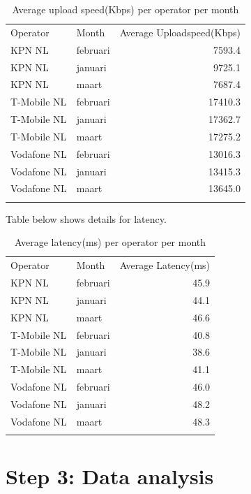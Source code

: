 \documentclass[]{article}
\begin{document}
\begin{longtable}[c]{@{}llr@{}}
\toprule\addlinespace
Operator & Month & Average Uploadspeed(Kbps)
\\\addlinespace
\midrule\endhead
KPN NL & februari & 7593.4
\\\addlinespace
KPN NL & januari & 9725.1
\\\addlinespace
KPN NL & maart & 7687.4
\\\addlinespace
T-Mobile NL & februari & 17410.3
\\\addlinespace
T-Mobile NL & januari & 17362.7
\\\addlinespace
T-Mobile NL & maart & 17275.2
\\\addlinespace
Vodafone NL & februari & 13016.3
\\\addlinespace
Vodafone NL & januari & 13415.3
\\\addlinespace
Vodafone NL & maart & 13645.0
\\\addlinespace
\bottomrule
\addlinespace
\caption{Average upload speed(Kbps) per operator per month}
\end{longtable}

Table below shows details for latency.

\begin{longtable}[c]{@{}llr@{}}
\toprule\addlinespace
Operator & Month & Average Latency(ms)
\\\addlinespace
\midrule\endhead
KPN NL & februari & 45.9
\\\addlinespace
KPN NL & januari & 44.1
\\\addlinespace
KPN NL & maart & 46.6
\\\addlinespace
T-Mobile NL & februari & 40.8
\\\addlinespace
T-Mobile NL & januari & 38.6
\\\addlinespace
T-Mobile NL & maart & 41.1
\\\addlinespace
Vodafone NL & februari & 46.0
\\\addlinespace
Vodafone NL & januari & 48.2
\\\addlinespace
Vodafone NL & maart & 48.3
\\\addlinespace
\bottomrule
\addlinespace
\caption{Average latency(ms) per operator per month}
\end{longtable}

\newpage

\section{Step 3: Data analysis}\label{step-3-data-analysis}
\end{document}
